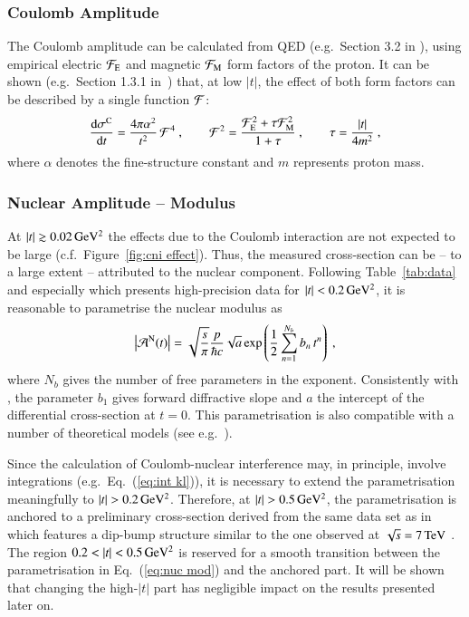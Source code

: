 \subsubsection{Coulomb Amplitude}
\label{sec:cni coulomb}
%
The Coulomb amplitude can be calculated from QED (e.g.~Section 3.2 in \cite{block06}), using empirical electric ${\cal F}_{\rm E}$ and magnetic ${\cal F}_{\rm M}$ form factors of the proton. It can be shown (e.g.~Section 1.3.1 in~\cite{jan_thesis}) that, at low $|t|$, the effect of both form factors can be described by a single function ${\cal F}$:
\begin{equation}
\label{eq:coul cs}
	{\d\sigma^{\rm C}\over \d t} = {4\pi\alpha^2\over t^2}\,{\cal F}^4\ ,\qquad 
	{\cal F}^2 = {{\cal F}_{\rm E}^2 + \tau {\cal F}_{\rm M}^2\over 1 + \tau}\ ,\qquad 
	\tau = {|t|\over 4m^2}\ ,
\end{equation}
where $\alpha$ denotes the fine-structure constant and $m$ represents proton mass.



\subsubsection{Nuclear Amplitude -- Modulus}
\label{sec:cni nuclear modulus}

At $|t| \gtrsim 0.02\,{\rm GeV^2}$ the effects due to the Coulomb interaction are not expected to be large (c.f.~Figure~\ref{fig:cni effect}). Thus, the measured cross-section can be -- to a large extent -- attributed to the nuclear component. Following Table~\ref{tab:data} and especially \cite{8tev-90m} which presents high-precision data for $|t| < 0.2\,{\rm GeV^2}$, it is reasonable to parametrise the nuclear modulus as
\begin{equation}
\label{eq:nuc mod}
\left | {\cal A}^{\rm N}(t) \right | = \sqrt{s\over\pi} {p\over \hbar c} \sqrt{a} \exp\left( {1\over 2} \sum\limits_{n = 1}^{N_b} b_n\, t^n \right)\ ,
\end{equation}
where $N_b$ gives the number of free parameters in the exponent. Consistently with \cite{8tev-90m}, the parameter $b_1$ gives forward diffractive slope and $a$ the intercept of the differential cross-section at $t=0$. This parametrisation is also compatible with a number of theoretical models (see e.g.~\cite{elegent}).

Since the calculation of Coulomb-nuclear interference may, in principle, involve integrations (e.g.~Eq.~(\ref{eq:int kl})), it is necessary to extend the parametrisation meaningfully to $|t| > 0.2\,{\rm GeV^2}$. Therefore, at $|t| > 0.5\,{\rm GeV^2}$, the parametrisation is anchored to a preliminary cross-section derived from the same data set as in \cite{8tev-90m} which features a dip-bump structure similar to the one observed at $\sqrt{s} = 7\,{\rm TeV}$ \cite{epl95}. The region $0.2 < |t| < 0.5\,{\rm GeV^2}$ is reserved for a smooth transition between the parametrisation in Eq.~(\ref{eq:nuc mod}) and the anchored part. It will be shown that changing the high-$|t|$ part has negligible impact on the results presented later on.


